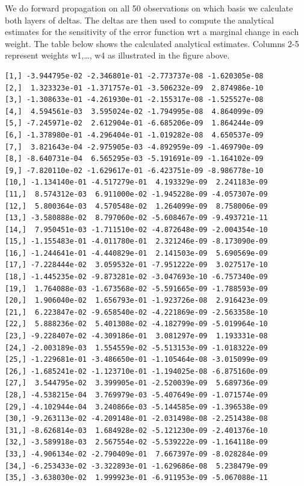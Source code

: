 \documentclass[11pt]{article}
\begin{document}
We do forward propagation on all 50 observations on which basis we calculate both layers of deltas. The deltas are then used to compute the analytical estimates for the sensitivity of the error function wrt a marginal change in each weight. The table below shows the calculated analytical estimates. Columns 2-5 represent weights w1,\ldots, w4 as illustrated in the figure above.


\begin{lstlisting}
[1,] -3.944795e-02 -2.346801e-01 -2.773737e-08 -1.620305e-08
[2,]  1.323323e-01 -1.371757e-01 -3.506232e-09  2.874986e-10
[3,] -1.308633e-01 -4.261930e-01 -2.155317e-08 -1.525527e-08
[4,]  4.594561e-03  3.595024e-02 -1.794995e-08  4.864099e-09
[5,] -7.245971e-02  2.612904e-01 -6.685206e-09  1.864244e-09
[6,] -1.378980e-01 -4.296404e-01 -1.019282e-08  4.650537e-09
[7,]  3.821643e-04 -2.975905e-03 -4.892959e-09 -1.469790e-09
[8,] -8.640731e-04  6.565295e-03 -5.191691e-09 -1.164102e-09
[9,] -7.820110e-02 -1.629617e-01 -6.423751e-09 -8.986778e-10
[10,] -1.134140e-01 -4.517279e-01  4.193329e-09  2.241183e-09
[11,]  8.574312e-03  6.911000e-02 -1.945228e-09 -4.057307e-09
[12,]  5.800364e-03  4.570548e-02  1.264099e-09  8.758006e-09
[13,] -3.580888e-02  8.797060e-02 -5.608467e-09 -9.493721e-11
[14,]  7.950451e-03 -1.711510e-02 -4.872648e-09 -2.004354e-10
[15,] -1.155483e-01 -4.011780e-01  2.321246e-09 -8.173090e-09
[16,] -1.244641e-01 -4.440829e-01  2.141503e-09  5.690569e-09
[17,] -7.228444e-02  3.059532e-01 -7.951222e-09  3.027517e-10
[18,] -1.445235e-02 -9.873281e-02 -3.047693e-10 -6.757340e-09
[19,]  1.764088e-03 -1.673568e-02 -5.591665e-09 -1.788593e-09
[20,]  1.906040e-02  1.656793e-01 -1.923726e-08  2.916423e-09
[21,]  6.223847e-02 -9.658540e-02 -4.221869e-09 -2.563358e-10
[22,]  5.888236e-02  5.401308e-02 -4.182799e-09 -5.019964e-10
[23,] -9.228407e-02 -4.309186e-01  3.081297e-09  1.193331e-08
[24,] -2.003189e-03  1.554559e-02 -5.513153e-09 -1.018322e-09
[25,] -1.229681e-01 -3.486650e-01 -1.105464e-08 -3.015099e-09
[26,] -1.685241e-02 -1.123710e-01 -1.194025e-08 -6.875160e-09
[27,]  3.544795e-02  3.399905e-01 -2.520039e-09  5.689736e-09
[28,] -4.538215e-04  3.769979e-03 -5.407649e-09 -1.071574e-09
[29,] -4.102944e-04  3.240866e-03 -5.144585e-09 -1.396538e-09
[30,] -9.263113e-02 -4.209148e-01 -2.031498e-08 -2.251438e-08
[31,] -8.626814e-03  1.684928e-02 -5.121230e-09 -2.401376e-10
[32,] -3.589918e-03  2.567554e-02 -5.539222e-09 -1.164118e-09
[33,] -4.906134e-02 -2.790409e-01  7.667397e-09 -8.028284e-09
[34,] -6.253433e-02 -3.322893e-01 -1.629686e-08  5.238479e-09
[35,] -3.638030e-02  1.999923e-01 -6.911953e-09 -5.067088e-11

\end{lstlisting}
\end{document}
